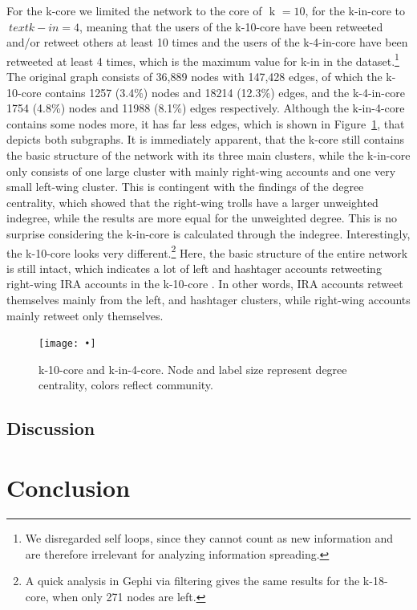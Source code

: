 \documentclass[12pt, titlepage=true, toc=bib]{scrartcl}
\begin{document}
For the k-core we limited the network to the core of \(\text{ k } = 10 \), for the k-in-core to \(\ text{ k-in } = 4\), meaning that the users of the k-10-core have been retweeted and/or retweet others at least 10 times and the users of the k-4-in-core have been retweeted at least 4 times, which is the maximum value for k-in in the dataset.\footnote{We disregarded self loops, since they cannot count as new information and are therefore irrelevant for analyzing information spreading.} The original graph consists of 36,889 nodes with 147,428 edges, of which the k-10-core contains 1257 (3.4\%) nodes and 18214 (12.3\%) edges, and the k-4-in-core 1754 (4.8\%) nodes and 11988 (8.1\%) edges respectively. Although the k-in-4-core contains some nodes more, it has far less edges, which is shown in Figure~\ref{fig:kcore}, that depicts both subgraphs. It is immediately apparent, that the k-core still contains the basic structure of the network with its three main clusters, while the k-in-core only consists of one large cluster with mainly right-wing accounts and one very small left-wing cluster. This is contingent with the findings of the degree centrality, which showed that the right-wing trolls have a larger unweighted indegree, while the results are more equal for the unweighted degree. This is no surprise considering the k-in-core is calculated through the indegree. Interestingly, the k-10-core looks very different.\footnote{A quick analysis in Gephi via filtering gives the same results for the k-18-core, when only 271 nodes are left.} Here, the basic structure of the entire network is still intact, which indicates a lot of left and hashtager accounts retweeting right-wing IRA accounts in the k-10-core . In other words, IRA accounts retweet themselves mainly from the left, and hashtager clusters, while right-wing accounts mainly retweet only themselves.

\begin{figure}[!ht]
\centering
\texttt{[image: •]}
\caption{k-10-core and k-in-4-core. Node and label size represent degree centrality, colors reflect community.}
\label{fig:kcore}
\end{figure}

\subsection{Discussion}

\section{Conclusion}




\newpage

\printbibliography
\end{document}
